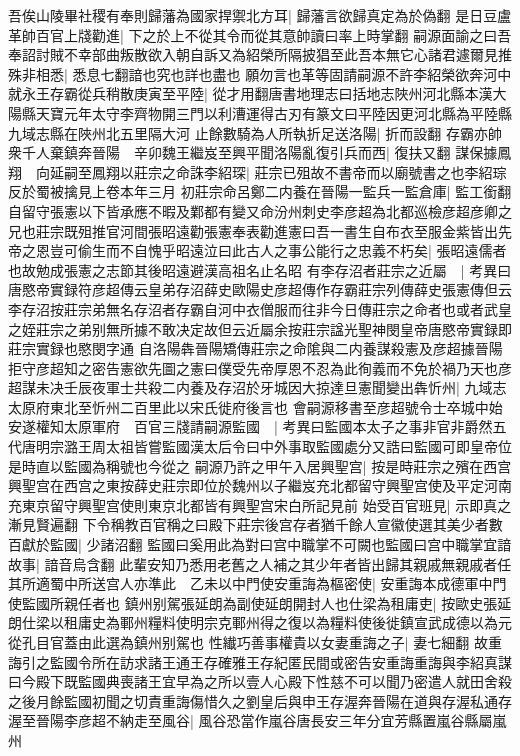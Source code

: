 吾俟山陵畢社稷有奉則歸藩為國家捍禦北方耳|{
	歸藩言欲歸真定為於偽翻}
是日豆盧革帥百官上牋勸進|{
	下之於上不從其令而從其意帥讀曰率上時掌翻}
嗣源面諭之曰吾奉詔討賊不幸部曲叛散欲入朝自訴又為紹榮所隔披猖至此吾本無它心諸君遽爾見推殊非相悉|{
	悉息七翻諳也究也詳也盡也}
願勿言也革等固請嗣源不許李紹榮欲奔河中就永王存霸從兵稍散庚寅至平陸|{
	從才用翻唐書地理志曰括地志陜州河北縣本漢大陽縣天寶元年太守李齊物開三門以利漕運得古刃有篆文曰平陸因更河北縣為平陸縣九域志縣在陜州北五里隔大河}
止餘數騎為人所執折足送洛陽|{
	折而設翻}
存霸亦帥衆千人棄鎮奔晉陽　辛卯魏王繼岌至興平聞洛陽亂復引兵而西|{
	復扶又翻}
謀保據鳳翔　向延嗣至鳳翔以莊宗之命誅李紹琛|{
	莊宗已殂故不書帝而以廟號書之也李紹琮反於蜀被擒見上卷本年三月}
初莊宗命呂鄭二内養在晉陽一監兵一監倉庫|{
	監工銜翻}
自留守張憲以下皆承應不暇及鄴都有變又命汾州刺史李彦超為北都巡檢彦超彦卿之兄也莊宗既殂推官河間張昭遠勸張憲奉表勸進憲曰吾一書生自布衣至服金紫皆出先帝之恩豈可偷生而不自愧乎昭遠泣曰此古人之事公能行之忠義不朽矣|{
	張昭遠儒者也故勉成張憲之志節其後昭遠避漢高祖名止名昭}
有李存沼者莊宗之近屬　|{
	考異曰唐愍帝實録符彦超傳云皇弟存沼薛史歐陽史彦超傳作存霸莊宗列傳薛史張憲傳但云李存沼按莊宗弟無名存沼者存霸自河中衣僧服而往非今日傳莊宗之命者也或者武皇之姪莊宗之弟别無所據不敢决定故但云近屬余按莊宗諡光聖神閔皇帝唐愍帝實録即莊宗實録也愍閔字通}
自洛陽犇晉陽矯傳莊宗之命隂與二内養謀殺憲及彦超據晉陽拒守彦超知之密告憲欲先圖之憲曰僕受先帝厚恩不忍為此徇義而不免於禍乃天也彦超謀未决壬辰夜軍士共殺二内養及存沼於牙城因大掠達旦憲聞變出犇忻州|{
	九域志太原府東北至忻州二百里此以宋氏徙府後言也}
會嗣源移書至彦超號令士卒城中始安遂權知太原軍府　百官三牋請嗣源監國　|{
	考異曰監國本太子之事非官非爵然五代唐明宗潞王周太祖皆嘗監國漢太后令曰中外事取監國處分又誥曰監國可即皇帝位是時直以監國為稱號也今從之}
嗣源乃許之甲午入居興聖宫|{
	按是時莊宗之殯在西宫興聖宫在西宫之東按薛史莊宗即位於魏州以子繼岌充北都留守興聖宫使及平定河南充東京留守興聖宫使則東京北都皆有興聖宫宋白所記見前}
始受百官班見|{
	示即真之漸見賢遍翻}
下令稱教百官稱之曰殿下莊宗後宫存者猶千餘人宣徽使選其美少者數百獻於監國|{
	少諸沼翻}
監國曰奚用此為對曰宫中職掌不可闕也監國曰宫中職掌宜諳故事|{
	諳音烏含翻}
此輩安知乃悉用老舊之人補之其少年者皆出歸其親戚無親戚者任其所適蜀中所送宫人亦準此　乙未以中門使安重誨為樞密使|{
	安重誨本成德軍中門使監國所親任者也}
鎮州别駕張延朗為副使延朗開封人也仕梁為租庸吏|{
	按歐史張延朗仕梁以租庸史為鄆州糧料使明宗克鄆州得之復以為糧料使後徙鎮宣武成德以為元從孔目官蓋由此選為鎮州别駕也}
性纎巧善事權貴以女妻重誨之子|{
	妻七細翻}
故重誨引之監國令所在訪求諸王通王存確雅王存紀匿民間或密告安重誨重誨與李紹真謀曰今殿下既監國典喪諸王宜早為之所以壹人心殿下性慈不可以聞乃密遣人就田舍殺之後月餘監國初聞之切責重誨傷惜久之劉皇后與申王存渥奔晉陽在道與存渥私通存渥至晉陽李彦超不納走至風谷|{
	風谷恐當作嵐谷唐長安三年分宜芳縣置嵐谷縣屬嵐州}
